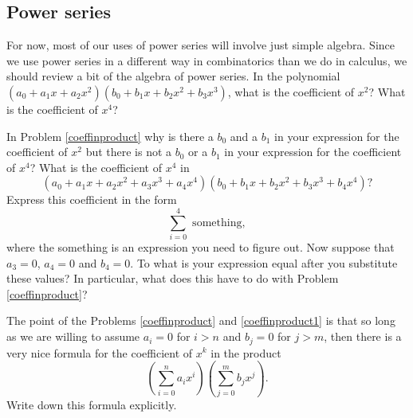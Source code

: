 \subsection{Power series}  For now, most of our uses of power series will
involve just simple algebra.  Since we use power series in a different
way in combinatorics than we do in calculus, we should review a bit of
the algebra of power series. 
\bp
\iteme In the polynomial $(a_0 +a_1x+a_2x^2)(b_0+b_1x+b_2x^2+b_3x^3)$,
what is the coefficient of $x^2$?  What is the coefficient of $x^4$?
\label{coeffinproduct} 

\iteme In Problem \ref{coeffinproduct} why is there a $b_0$ and a $b_1$ in
your expression for the coefficient of $x^2$ but there is not a $b_0$
or a $b_1$ in your  expression for the coefficient of  $x^4$?  What is the
coefficient of $x^4$ in $$(a_0+a_1x+a_2x^2+a_3x^3+a_4x^4)(b_0+b_1x+b_2x^2
+b_3x^3+b_4x^4)?$$
Express this coefficient in the form
$$\sum_{i=0}^4 \mbox{ something},$$
where the something is an expression you need to figure out.  Now suppose
that $a_3=0$, $a_4=0$ and $b_4=0$.  To what is your expression equal
after you substitute these values?  In particular, what does this have to
do with Problem \ref{coeffinproduct}?\label{coeffinproduct1}


\iteme The point of the Problems \ref{coeffinproduct} and
\ref{coeffinproduct1} is that so long as we are willing to assume $a_i=0$
for $i>n$ and $b_j =0$
 for $j>m$, then there is a very nice formula for the coefficient of
$x^k$ in the product
$$\left(\sum_{i=0}^n a_ix^i\right)\left(\sum_{j=0}^m b_jx^j\right).$$ 
Write down this formula explicitly.

